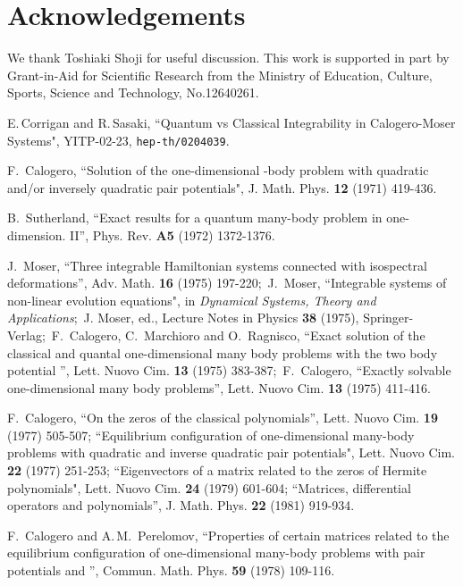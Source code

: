 \documentclass[a4paper,12pt]{article}
\begin{document}
\section*{Acknowledgements}
We thank  Toshiaki Shoji for useful discussion.
This work is supported in part by Grant-in-Aid for Scientific Research from
the Ministry of Education, Culture, Sports, Science and Technology,
No.12640261.

\begin{thebibliography}{99}

E.\,Corrigan and R.\,Sasaki,
``Quantum vs Classical  Integrability in Calogero-Moser Systems",
YITP-02-23, {\tt hep-th/0204039}.

F.~Calogero,
``Solution of the one-dimensional \coordHE{}-body problem with quadratic
and/or inversely quadratic pair potentials",
J. Math. Phys. {\bf 12} (1971) 419-436.

B.~Sutherland,
``Exact results for a quantum many-body problem in one-dimension. II'',
Phys. Rev. {\bf A5} (1972) 1372-1376.

J.~Moser,
``Three integrable Hamiltonian systems connected with isospectral
deformations'',
Adv. Math. {\bf 16} (1975) 197-220;\
J.~Moser,
``Integrable systems of non-linear evolution equations",
in {\it Dynamical Systems, Theory and Applications\/};\
J. Moser, ed., Lecture Notes in Physics {\bf 38} (1975), Springer-Verlag;\
F.~Calogero, C.~Marchioro and O.~Ragnisco,
``Exact solution of the classical and quantal one-dimensional many body
problems with the two body potential \coordHE{}'',
Lett. Nuovo Cim. {\bf 13} (1975) 383-387;\
F.~Calogero,
``Exactly solvable one-dimensional many body problems'',
Lett. Nuovo Cim. {\bf 13} (1975) 411-416.

F.~Calogero,
``On the zeros of the classical polynomials'',
Lett. Nuovo Cim. {\bf 19} (1977) 505-507;
``Equilibrium configuration of one-dimensional many-body problems
with quadratic and inverse quadratic pair potentials",
Lett. Nuovo Cim. {\bf 22} (1977) 251-253;
``Eigenvectors of a matrix related to the zeros of Hermite polynomials",
Lett. Nuovo Cim. {\bf 24} (1979) 601-604;
``Matrices, differential operators and polynomials'',
J. Math. Phys. {\bf 22} (1981) 919-934.

\bibitem{calpere}
F.~Calogero and A.\,M.~Perelomov,
``Properties of certain matrices related to the equilibrium
configuration of one-dimensional many-body problems with pair
potentials \coordHE{} and \coordHE{}'',
Commun. Math. Phys. {\bf 59} (1978) 109-116.


\end{thebibliography}
\end{document}
